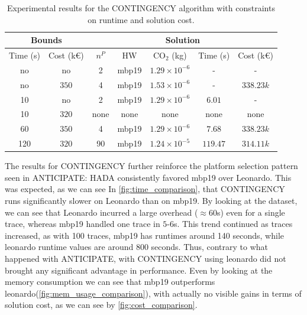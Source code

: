 \documentclass[a4paper,singleside,12pt]{report} %
\begin{document}
\begin{table}[h!]
    \centering
    \begin{tabular}{|cc|ccccc|}
        \hline
        \multicolumn{2}{|c|}{Bounds} & \multicolumn{5}{c|}{Solution} \\
        \hline
        Time (s) & Cost (k€) & $n^P$ & HW & CO$_2$ (kg) & Time (s) & Cost (k€) \\
        \hline
        no & no & 2 & mbp19 & $1.29 \times 10^{-6}$ & - & - \\
        no & $350$ & 4 & mbp19 & $1.53 \times 10^{-6}$ & - & $338.23k$ \\
        10 & no & 2 & mbp19 & $1.29 \times 10^{-6}$ & $6.01$ & - \\
        10 & $320$ & none & none & none & none & none \\
        60 & $350$ & 4 & mbp19 & $1.29 \times 10^{-6}$ & $7.68$ & $338.23k$ \\
        120 & $320$ & 90 & mbp19 & $1.24 \times 10^{-5}$ & $119.47$ & $314.11k$ \\
        \hline
    \end{tabular}
    \caption{Experimental results for the CONTINGENCY algorithm with constraints on runtime and solution cost.}
    \label{tab:contingency_results}
\end{table}

The results for CONTINGENCY further reinforce the platform selection pattern seen in ANTICIPATE: HADA consistently favored mbp19 over Leonardo. This was expected, as we can see In
\ref{fig:time_comparison}, that CONTINGENCY runs significantly slower on Leonardo than on mbp19. By looking at the dataset, we can see that Leonardo incurred a large overhead ($\approx60$s) 
even for a single trace, whereas mbp19 handled one trace in $5$-$6$s. This trend continued as traces increased, as with 100 traces, mbp19 has runtimes around 140 seconds, while leonardo runtime
values are around 800 seconds. Thus, contrary to what happened with ANTICIPATE, with CONTINGENCY using leonardo did not brought any significant advantage in performance. Even by looking at the
memory consumption we can see that mbp19 outperforms leonardo(\ref{fig:mem_usage_comparison}), with actually no visible gains in terms of solution cost, as we can see by \ref{fig:cost_comparison}. 
\end{document}
